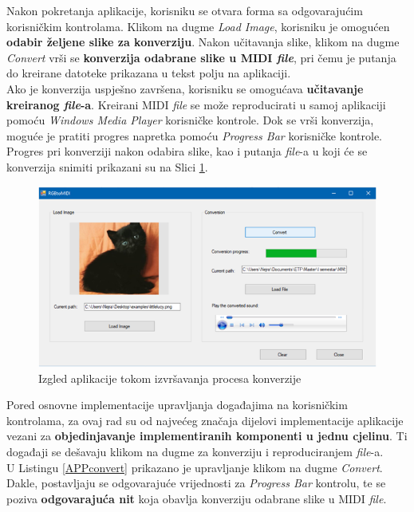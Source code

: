\documentclass[12pt,a4paper]{article}
\begin{document}
Nakon pokretanja aplikacije, korisniku se otvara forma sa odgovarajućim korisničkim kontrolama. Klikom na dugme \textit{Load Image}, korisniku je omogućen \textbf{odabir željene slike za konverziju}. Nakon učitavanja slike, klikom na dugme \textit{Convert} vrši se \textbf{konverzija odabrane slike u MIDI \textit{file}}, pri čemu je putanja do kreirane datoteke prikazana u tekst polju na aplikaciji. \\

Ako je konverzija uspješno završena, korisniku se omogućava \textbf{učitavanje kreiranog \textit{file}-a}. Kreirani MIDI \textit{file} se može reproducirati u samoj aplikaciji pomoću \textit{Windows Media Player} korisničke kontrole. Dok se vrši konverzija, moguće je pratiti progres napretka pomoću \textit{Progress Bar} korisničke kontrole. Progres pri konverziji nakon odabira slike, kao i putanja \textit{file}-a u koji će se konverzija snimiti prikazani su na Slici \ref{workingApp}.

\begin{figure}[H]

\center
\includegraphics[scale=0.95]{../res/workingApp.PNG}
\caption{Izgled aplikacije tokom izvršavanja procesa konverzije}
\label{workingApp}

\end{figure}

Pored osnovne implementacije upravljanja događajima na korisničkim kontrolama, za ovaj rad su od najvećeg značaja dijelovi implementacije aplikacije vezani za \textbf{objedinjavanje implementiranih komponenti u jednu cjelinu}. Ti događaji se dešavaju klikom na dugme za konverziju i reproduciranjem \textit{file}-a. \\

U Listingu \ref{APPconvert} prikazano je upravljanje klikom na dugme \textit{Convert}. Dakle, postavljaju se odgovarajuće vrijednosti za \textit{Progress Bar} kontrolu, te se poziva \textbf{odgovarajuća nit} koja obavlja konverziju odabrane slike u MIDI \textit{file}.
\end{document}
